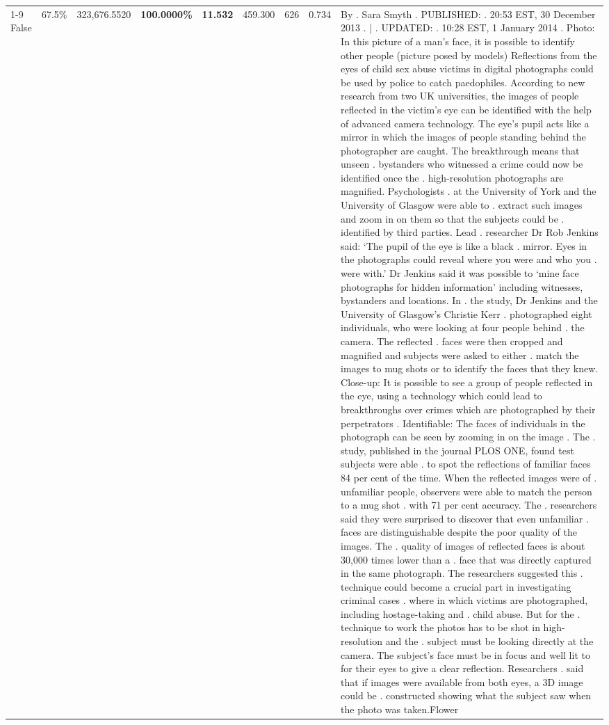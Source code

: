 \begin{table}[H]
\begin{tabular}{lllrlllll}
\cline{1-9}
False & 67.5\% & 323,676.5520 & \bfseries \color{red} 100.0000\% & \bfseries \color{red} 11.532 & 459.300 & 626 & 0.734 & By . Sara Smyth . PUBLISHED: . 20:53 EST, 30 December 2013 . | . UPDATED: . 10:28 EST, 1 January 2014 . Photo: In this picture of a man's face, it is possible to identify other people (picture posed by models) Reflections from the eyes of child sex abuse victims in digital photographs could be used by police to catch paedophiles. According to new research from two UK universities, the images of people reflected in the victim's eye can be identified with the help of advanced camera technology. The eye's pupil acts like a mirror in which the images of people standing behind the photographer are caught. The breakthrough means that unseen . bystanders who witnessed a crime could now be identified once the . high-resolution photographs are magnified. Psychologists . at the University of York and the University of Glasgow were able to . extract such images and zoom in on them so that the subjects could be . identified by third parties. Lead . researcher Dr Rob Jenkins said: ‘The pupil of the eye is like a black . mirror. Eyes in the photographs could reveal where you were and who you . were with.' Dr Jenkins said it was possible to ‘mine face photographs for hidden information' including witnesses, bystanders and locations. In . the study, Dr Jenkins and the University of Glasgow's Christie Kerr . photographed eight individuals, who were looking at four people behind . the camera. The reflected . faces were then cropped and magnified and subjects were asked to either . match the images to mug shots or to identify the faces that they knew. Close-up: It is possible to see a group of people reflected in the eye, using a technology which could lead to breakthroughs over crimes which are photographed by their perpetrators . Identifiable: The faces of individuals in the photograph can be seen by zooming in on the image . The . study, published in the journal PLOS ONE, found test subjects were able . to spot the reflections of familiar faces 84 per cent of the time. When the reflected images were of . unfamiliar people, observers were able to match the person to a mug shot . with 71 per cent accuracy. The . researchers said they were surprised to discover that even unfamiliar . faces are distinguishable despite the poor quality of the images. The . quality of images of reflected faces is about 30,000 times lower than a . face that was directly captured in the same photograph. The researchers suggested this . technique could become a crucial part in investigating criminal cases . where in which victims are photographed, including hostage-taking and . child abuse. But for the . technique to work the photos has to be shot in high-resolution and the . subject must be looking directly at the camera. The subject's face must be in focus and well lit to for their eyes to give a clear reflection. Researchers . said that if images were available from both eyes, a 3D image could be . constructed showing what the subject saw when the photo was taken.Flower \\

\end{tabular}
\end{table}
